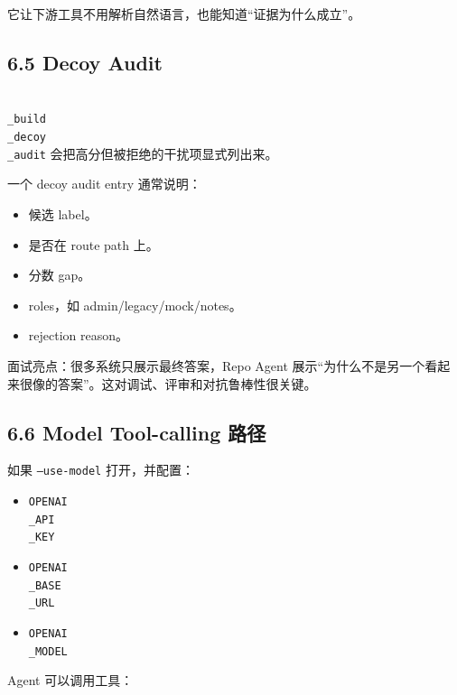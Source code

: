 \documentclass[UTF8,12pt,openany]{ctexbook}
\begin{document}
它让下游工具不用解析自然语言，也能知道“证据为什么成立”。\par

\subsection{6.5 Decoy Audit}

\texttt{\\_build\\_decoy\\_audit} 会把高分但被拒绝的干扰项显式列出来。\par

一个 decoy audit entry 通常说明：\par

\begin{itemize}
\item 候选 label。
\item 是否在 route path 上。
\item 分数 gap。
\item roles，如 admin/legacy/mock/notes。
\item rejection reason。
\end{itemize}

面试亮点：很多系统只展示最终答案，Repo Agent 展示“为什么不是另一个看起来很像的答案”。这对调试、评审和对抗鲁棒性很关键。\par

\subsection{6.6 Model Tool-calling 路径}

如果 \texttt{--use-model} 打开，并配置：\par

\begin{itemize}
\item \texttt{OPENAI\\_API\\_KEY}
\item \texttt{OPENAI\\_BASE\\_URL}
\item \texttt{OPENAI\\_MODEL}
\end{itemize}

Agent 可以调用工具：\par
\end{document}
